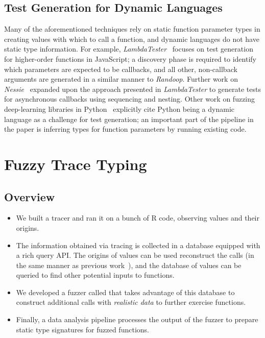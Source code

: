 \documentclass[sigplan,anonymous,review]{acmart}
\begin{document}
\subsection{Test Generation for Dynamic Languages}

Many of the aforementioned techniques rely on static function parameter types in creating values with which to call a function, and dynamic languages do not have static type information.
For example, \emph{LambdaTester}~\cite{lambdatester} focuses on test generation for higher-order functions in JavaScript; a discovery phase is required to identify which parameters are expected to be callbacks, and all other, non-callback arguments are generated in a similar manner to \emph{Randoop}.
Further work on \emph{Nessie}~\cite{arteca2022nessie} expanded upon the approach presented in \emph{LambdaTester} to generate tests for asynchronous callbacks using sequencing and nesting.
Other work on fuzzing deep-learning libraries in Python~\cite{wei2022free} explicitly cite Python being a dynamic language as a challenge for test generation; an important part of the pipeline in the paper is inferring types for function parameters by running existing code.


\section{Fuzzy Trace Typing}
\label{sec:fuzzy}

\subsection{Overview}

\begin{itemize}
    \item We built a tracer and ran it on a bunch of R code, observing values and their origins. 
    \item The information obtained via tracing is collected in a database equipped with a rich query API. 
    The origins of values can be used reconstruct the calls (in the same manner as previous work~\cite{turcotte2020designing}), and the database of values can be queried to find other potential inputs to functions.
    \item We developed a fuzzer called \tool that takes advantage of this database to construct additional calls with \textit{realistic data} to further exercise functions.
    \item Finally, a data analysis pipeline processes the output of the fuzzer to prepare static type signatures for fuzzed functions.
\end{itemize}
\end{document}
